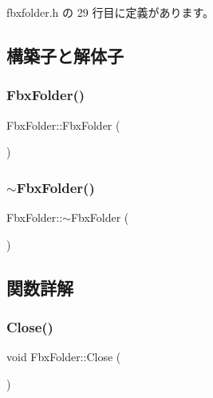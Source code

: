  fbxfolder.\+h の 29 行目に定義があります。



\subsection{構築子と解体子}
\mbox{\label{class_fbx_folder_aa62f568592036dc48a8d74b212da117c}} 
\subsubsection{\texorpdfstring{Fbx\+Folder()}{FbxFolder()}}
{\footnotesize\ttfamily Fbx\+Folder\+::\+Fbx\+Folder (\begin{DoxyParamCaption}{ }\end{DoxyParamCaption})}

\mbox{\label{class_fbx_folder_a59775e144959137b55f9f7e2eefccfb4}} 
\subsubsection{\texorpdfstring{$\sim$\+Fbx\+Folder()}{~FbxFolder()}}
{\footnotesize\ttfamily Fbx\+Folder\+::$\sim$\+Fbx\+Folder (\begin{DoxyParamCaption}{ }\end{DoxyParamCaption})}



\subsection{関数詳解}
\mbox{\label{class_fbx_folder_a43be1ed2f95c3a0876b32b1e89a57c03}} 
\subsubsection{\texorpdfstring{Close()}{Close()}}
{\footnotesize\ttfamily void Fbx\+Folder\+::\+Close (\begin{DoxyParamCaption}{ }\end{DoxyParamCaption})}

